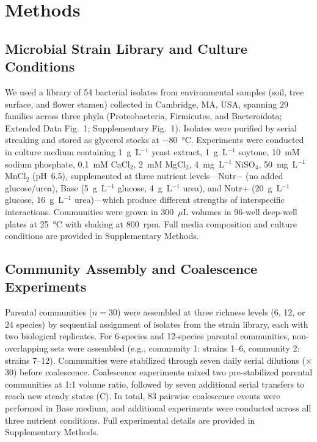 \section{Methods}
\label{sec:methods}

\subsection*{Microbial Strain Library and Culture Conditions}
\label{sec:methods:strains}

We used a library of 54 bacterial isolates from environmental samples (soil, tree surface, and flower stamen) collected in Cambridge, MA, USA, spanning 29 families across three phyla (Proteobacteria, Firmicutes, and Bacteroidota; Extended Data Fig.~1; Supplementary Fig.~1). Isolates were purified by serial streaking and stored as glycerol stocks at $-80$~°C. Experiments were conducted in culture medium containing 1~g~L$^{-1}$ yeast extract, 1~g~L$^{-1}$ soytone, 10~mM sodium phosphate, 0.1~mM CaCl$_2$, 2~mM MgCl$_2$, 4~mg~L$^{-1}$ NiSO$_4$, 50~mg~L$^{-1}$ MnCl$_2$ (pH~6.5), supplemented at three nutrient levels---Nutr$-$ (no added glucose/urea), Base (5~g~L$^{-1}$ glucose, 4~g~L$^{-1}$ urea), and Nutr+ (20~g~L$^{-1}$ glucose, 16~g~L$^{-1}$ urea)---which produce different strengths of interspecific interactions. Communities were grown in 300~$\mu$L volumes in 96-well deep-well plates at 25~°C with shaking at 800~rpm. Full media composition and culture conditions are provided in Supplementary Methods.


\subsection*{Community Assembly and Coalescence Experiments}
\label{sec:methods:coalescence}

Parental communities ($n = 30$) were assembled at three richness levels (6, 12, or 24 species) by sequential assignment of isolates from the strain library, each with two biological replicates. For 6-species and 12-species parental communities, non-overlapping sets were assembled (e.g., community 1: strains 1--6, community 2: strains 7--12). Communities were stabilized through seven daily serial dilutions ($\times$30) before coalescence. Coalescence experiments mixed two pre-stabilized parental communities at 1:1 volume ratio, followed by seven additional serial transfers to reach new steady states (C). In total, 83 pairwise coalescence events were performed in Base medium, and additional experiments were conducted across all three nutrient conditions. Full experimental details are provided in Supplementary Methods.


